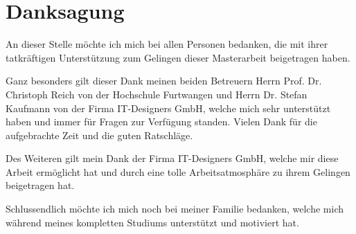 
\chapter*{Danksagung} %

An dieser Stelle möchte ich mich bei allen Personen bedanken, die mit ihrer tatkräftigen Unterstützung zum
Gelingen dieser Masterarbeit beigetragen haben.

Ganz besonders gilt dieser Dank meinen beiden Betreuern Herrn Prof. Dr. Christoph Reich von
der Hochschule Furtwangen und Herrn Dr. Stefan Kaufmann von der Firma IT-Designers GmbH, welche
mich sehr unterstützt haben und immer für Fragen zur Verfügung standen.
Vielen Dank für die aufgebrachte Zeit und die guten Ratschläge.

Des Weiteren gilt mein Dank der Firma IT-Designers GmbH, welche mir diese Arbeit ermöglicht hat und durch eine
tolle Arbeitsatmosphäre zu ihrem Gelingen beigetragen hat.

Schlussendlich möchte ich mich noch bei meiner Familie bedanken, welche mich während meines
kompletten Studiums unterstützt und motiviert hat.